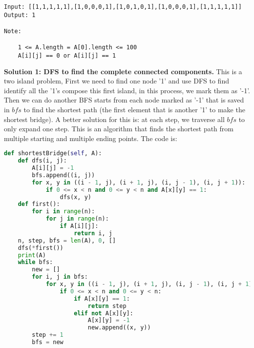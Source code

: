 \documentclass[../main.tex]{subfiles}
\begin{document}
\begin{examples}[resume]
\begin{lstlisting}[numbers=none]
Input: [[1,1,1,1,1],[1,0,0,0,1],[1,0,1,0,1],[1,0,0,0,1],[1,1,1,1,1]]
Output: 1

Note:

    1 <= A.length = A[0].length <= 100
    A[i][j] == 0 or A[i][j] == 1
\end{lstlisting}
\textbf{Solution 1: DFS to find the complete connected components.} This is a two island problem, First we need to find one node '1' and use DFS to find identify all the '1's compose this first island, in this process, we mark them as '-1'. Then we can do another BFS starts from each node marked as '-1' that is saved in $bfs$ to find the shortest path (the first element that is another '1' to make the shortest bridge). A better solution for this is: at each step, we traverse all $bfs$ to only expand one step. This is an algorithm that finds the shortest path from multiple starting and multiple ending points. The code is:
\begin{lstlisting}[language = Python]
def shortestBridge(self, A):
    def dfs(i, j):
        A[i][j] = -1
        bfs.append((i, j))
        for x, y in ((i - 1, j), (i + 1, j), (i, j - 1), (i, j + 1)):
            if 0 <= x < n and 0 <= y < n and A[x][y] == 1:
                dfs(x, y)
    def first():
        for i in range(n):
            for j in range(n):
                if A[i][j]:
                    return i, j
    n, step, bfs = len(A), 0, []
    dfs(*first())
    print(A)
    while bfs:
        new = []
        for i, j in bfs:
            for x, y in ((i - 1, j), (i + 1, j), (i, j - 1), (i, j + 1)):
                if 0 <= x < n and 0 <= y < n:
                    if A[x][y] == 1:
                        return step
                    elif not A[x][y]:
                        A[x][y] = -1
                        new.append((x, y))
        step += 1
        bfs = new
\end{lstlisting}

\end{examples}
\end{document}
